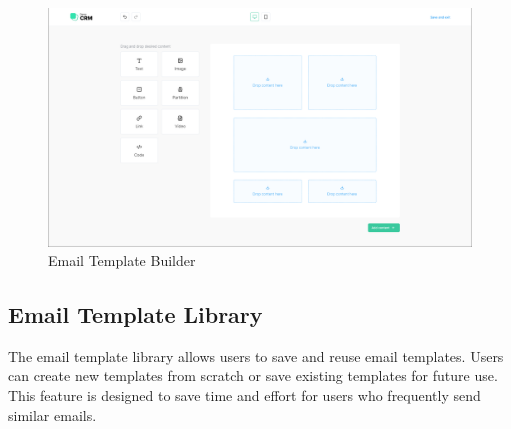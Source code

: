 \begin{figure}[ht]
	\centering
	\includegraphics[width=0.9\linewidth]{Images/Sprint1/screenshots/Screenshot 2024-05-26 214054.png}
	\caption{Email Template Builder}
	\label{fig:Email Template Builder}
\end{figure}

\subsection{Email Template Library}

The email template library allows users to save and reuse email templates. Users can create new templates from scratch or save existing templates for future use. This feature is designed to save time and effort for users who frequently send similar emails.

